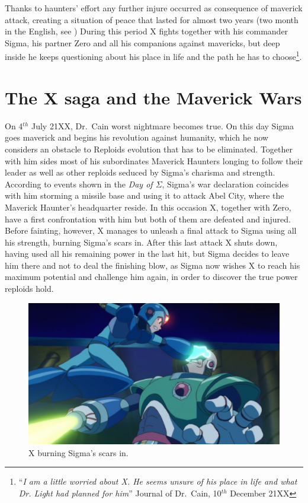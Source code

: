 Thanks to haunters' effort any further injure occurred as consequence of maverick attack, creating a situation of peace that lasted  for almost two years (two month in the English, see \PtIIWarning) During this period X fights together with his commander Sigma, his partner Zero and all his companions against mavericks, but deep inside he keeps questioning about his place in life and the path he has to choose\footnote{``\textit{I am a little worried about X. He seems unsure of his place in life and what Dr. Light had planned for him}'' Journal of Dr.~Cain, 10$^{th}$ December 21XX}.

\section{The X saga and the Maverick Wars}
On 4$^{th}$ July 21XX, Dr.~Cain worst nightmare becomes true. On this day Sigma goes maverick and begins his revolution against humanity, which he now considers an obstacle to Reploids evolution that has to be eliminated. Together with him sides most of his subordinates Maverick Haunters longing to follow their leader as well as other reploids seduced by Sigma's charisma and strength. According to events shown in the \textit{Day of $\Sigma$}, Sigma's war declaration coincides with him storming a missile base and using it to attack Abel City, where the Maverick Haunter's headquarter reside. In this occasion X, together with Zero, have a first confrontation with him but both of them are defeated and injured. Before fainting, however, X manages to unleash a final attack to Sigma using all his strength, burning Sigma's scars in. After this last attack X shuts down, having used all his remaining power in the last hit, but Sigma decides to leave him there and not to deal the finishing blow, as Sigma now wishes X to reach his maximum potential and challenge him again, in order to discover the true power reploids hold.
\begin{figure}[htp]
	\centering
	\includegraphics[width=.5\linewidth]{figures/X1/Sigma_scar.jpg}
	\caption{X burning Sigma's scars in.}
\end{figure}


